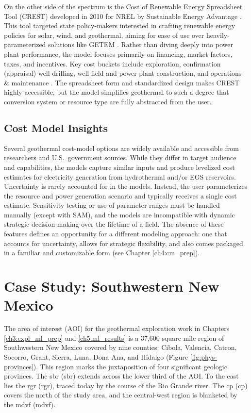 On the other side of the spectrum is the Cost of Renewable Energy Spreadsheet Tool (CREST) developed in 2010 for NREL by Sustainable Energy Advantage \citep{gifford_crest_2013}. This tool targeted state policy-makers interested in crafting renewable energy policies for solar, wind, and geothermal, aiming for ease of use over heavily-parameterized solutions like GETEM \citep{gifford_renewable_2011}. Rather than diving deeply into power plant performance, the model focuses primarily on financing, market factors, taxes, and incentives. Key cost buckets include exploration, confirmation (appraisal) well drilling, well field and power plant construction, and operations \& maintenance \citep{gifford_crest_2013}. The spreadsheet form and standardized design makes CREST highly accessible, but the model simplifies geothermal to such a degree that conversion system or resource type are fully abstracted from the user. 

\subsection{Cost Model Insights}\label{ch2:cost_model_insights}

Several geothermal cost-model options are widely available and accessible from researchers and U.S.\ government sources. While they differ in target audience and capabilities, the models capture similar inputs and produce levelized cost estimates for electricity generation from hydrothermal and/or EGS reservoirs. Uncertainty is rarely accounted for in the models. Instead, the user parameterizes the resource and power generation scenario and typically receives a single cost estimate. Sensitivity testing or use of parameter ranges must be handled manually (except with SAM), and the models are incompatible with dynamic strategic decision-making over the lifetime of a field. The absence of these features defines an opportunity for a different modeling approach: one that accounts for uncertainty, allows for strategic flexibility, and also comes packaged in a familiar and customizable form (see Chapter \ref{ch4:cm_prep}). 

\section{Case Study: Southwestern New Mexico}\label{ch2:case_outline}

The area of interest (AOI) for the geothermal exploration work in Chapters \ref{ch3:expl_ml_prep} and \ref{ch5:ml_results} is a 37,600 square mile region of Southwestern New Mexico covered by nine counties: Cibola, Valencia, Catron, Socorro, Grant, Sierra, Luna, Dona Ana, and Hidalgo (Figure \ref{fig:phys-provinces}). This region marks the juxtaposition of four significant geologic provinces. The \acrlong{sbr} (\acrshort{sbr}) extends across the lower third of the AOI. To the east lies the \acrlong{rgr} (\acrshort{rgr}), traced today by the course of the Rio Grande river. The \acrlong{cp} (\acrshort{cp}) covers the north of the study area, and the central-west region is blanketed by the \acrlong{mdvf} (\acrshort{mdvf}).

